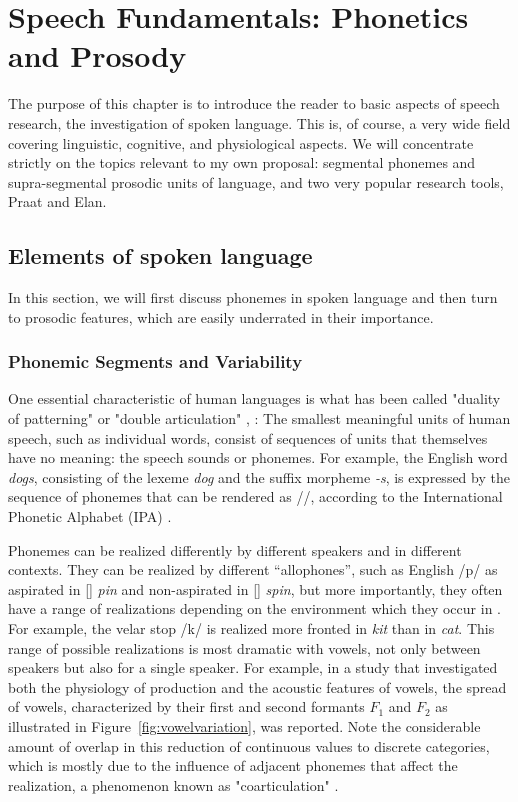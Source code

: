 \chapter{Speech Fundamentals: Phonetics and Prosody}
\label{StateOfArt}

The purpose of this chapter is to introduce the reader to basic aspects of speech research, the investigation of spoken language. This is, of course, a very wide field covering linguistic, cognitive, and physiological aspects. We will concentrate strictly on the topics relevant to my own proposal: segmental phonemes and supra-segmental prosodic units of language, and two very popular research tools, Praat and Elan.

\section{Elements of spoken language}

In this section, we will first discuss phonemes in spoken language and then turn to prosodic features, which are easily underrated in their importance.

\subsection{Phonemic Segments and Variability}

One essential characteristic of human languages is what has been called "duality of patterning" or "double articulation" \cite{hockett1958course}, \cite{martinet1960elements}: The smallest meaningful units of human speech, such as individual words, consist of sequences of units that themselves have no meaning: the speech sounds or phonemes. For example, the English word \textit{dogs}, consisting of the lexeme \textit{dog} and the suffix morpheme \textit{-s}, is expressed by the sequence of phonemes that can be rendered as //, according to the International Phonetic Alphabet (IPA) \cite{internationalphoneticassociation1999ipa}.

Phonemes can be realized differently by different speakers and in different contexts. They can be realized by different ``allophones'', such as English /p/ as aspirated in [] \textit{pin} and non-aspirated in [] \textit{spin}, but more importantly, they often have a range of realizations depending on the environment which they occur in \cite{internationalphoneticassociation1999ipa}. For example, the velar stop /k/ is realized more fronted in \textit{kit} than in \textit{cat}. This range of possible realizations is most dramatic with vowels, not only between speakers but also for a single speaker. For example, in a study that investigated both the physiology of production and the acoustic features of vowels, the spread of vowels, characterized by their first and second formants $F_1$ and $F_2$ as illustrated in Figure~\ref{fig:vowelvariation}, was reported. Note the considerable amount of overlap in this reduction of continuous values to discrete categories, which is mostly due to the influence of adjacent phonemes that affect the realization, a phenomenon known as "coarticulation" .

